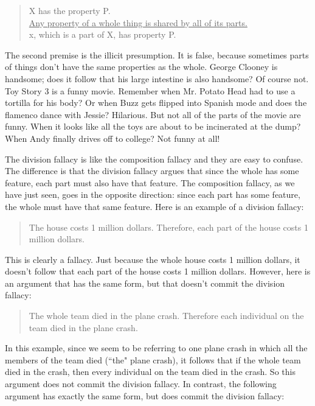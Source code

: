 \begin{quote}X has the property P. \\
\underline{Any property of a whole thing is shared by all of its parts.} \\
x, which is a part of X, has property P.
\end{quote}

The second premise is the illicit presumption. It is false, because sometimes parts of things don't
have the same properties as the whole. George Clooney is handsome; does it follow that his large
intestine is also handsome? Of course not. Toy Story 3 is a funny movie. Remember when Mr.
Potato Head had to use a tortilla for his body? Or when Buzz gets flipped into Spanish mode and
does the flamenco dance with Jessie? Hilarious. But not all of the parts of the movie are funny.
When it looks like all the toys are about to be incinerated at the dump? When Andy finally drives
off to college? Not funny at all!

The division fallacy is like the composition fallacy and they are easy to confuse.
The difference is that the division fallacy argues that since the whole has some
feature, each part must also have that feature. The composition fallacy, as we
have just seen, goes in the opposite direction: since each part has some feature,
the whole must have that same feature. Here is an example of a division fallacy:
        
\begin{quote}
The house costs 1 million dollars. Therefore, each part of the house costs 1 million dollars.
\end{quote}

This is clearly a fallacy. Just because the whole house costs 1 million dollars, it
doesn't follow that each part of the house costs 1 million dollars. However, here
is an argument that has the same form, but that doesn't commit the division
fallacy:

\begin{quote}
        The whole team died in the plane crash. Therefore each individual on the
        team died in the plane crash.
\end{quote}

In this example, since we seem to be referring to one plane crash in which all the
members of the team died (``the" plane crash), it follows that if the whole team
died in the crash, then every individual on the team died in the crash. So this
argument does not commit the division fallacy. In contrast, the following
argument has exactly the same form, but does commit the division fallacy:

